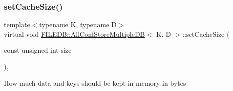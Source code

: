 \subsubsection{\texorpdfstring{setCacheSize()}{setCacheSize()}\hspace{0.1cm}{\footnotesize\ttfamily [1/2]}}
{\footnotesize\ttfamily template$<$typename K, typename D$>$ \\
virtual void \mbox{\hyperlink{classFILEDB_1_1AllConfStoreMultipleDB}{F\+I\+L\+E\+D\+B\+::\+All\+Conf\+Store\+Multiple\+DB}}$<$ K, D $>$\+::set\+Cache\+Size (\begin{DoxyParamCaption}\item[{const unsigned int}]{size }\end{DoxyParamCaption})\hspace{0.3cm}{\ttfamily [inline]}, {\ttfamily [virtual]}}

How much data and keys should be kept in memory in bytes

